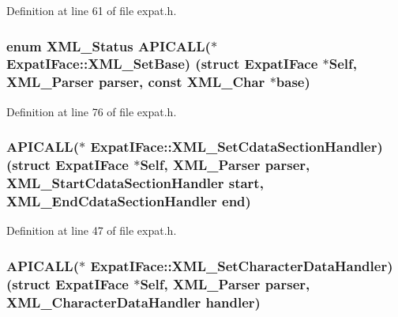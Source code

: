 Definition at line 61 of file expat.\+h.

\subsubsection[{\texorpdfstring{X\+M\+L\+\_\+\+Set\+Base}{XML_SetBase}}]{\setlength{\rightskip}{0pt plus 5cm}enum {\bf X\+M\+L\+\_\+\+Status} A\+P\+I\+C\+A\+LL($\ast$ Expat\+I\+Face\+::\+X\+M\+L\+\_\+\+Set\+Base) (struct {\bf Expat\+I\+Face} $\ast$Self, {\bf X\+M\+L\+\_\+\+Parser} parser, {\bf const} {\bf X\+M\+L\+\_\+\+Char} $\ast${\bf base})}\hypertarget{struct_expat_i_face_aff42e500f98ddfd2137942062e80af50}{}\label{struct_expat_i_face_aff42e500f98ddfd2137942062e80af50}


Definition at line 76 of file expat.\+h.

\subsubsection[{\texorpdfstring{X\+M\+L\+\_\+\+Set\+Cdata\+Section\+Handler}{XML_SetCdataSectionHandler}}]{ A\+P\+I\+C\+A\+LL($\ast$ Expat\+I\+Face\+::\+X\+M\+L\+\_\+\+Set\+Cdata\+Section\+Handler) (struct {\bf Expat\+I\+Face} $\ast$Self, {\bf X\+M\+L\+\_\+\+Parser} parser, {\bf X\+M\+L\+\_\+\+Start\+Cdata\+Section\+Handler} {\bf start}, {\bf X\+M\+L\+\_\+\+End\+Cdata\+Section\+Handler} {\bf end})}\hypertarget{struct_expat_i_face_a33b500ca8dfac64f76d539a0621049d0}{}\label{struct_expat_i_face_a33b500ca8dfac64f76d539a0621049d0}


Definition at line 47 of file expat.\+h.

\subsubsection[{\texorpdfstring{X\+M\+L\+\_\+\+Set\+Character\+Data\+Handler}{XML_SetCharacterDataHandler}}]{ A\+P\+I\+C\+A\+LL($\ast$ Expat\+I\+Face\+::\+X\+M\+L\+\_\+\+Set\+Character\+Data\+Handler) (struct {\bf Expat\+I\+Face} $\ast$Self, {\bf X\+M\+L\+\_\+\+Parser} parser, {\bf X\+M\+L\+\_\+\+Character\+Data\+Handler} handler)}\hypertarget{struct_expat_i_face_acf6eae55c85cdde06468f365aafb2fd5}{}\label{struct_expat_i_face_acf6eae55c85cdde06468f365aafb2fd5}


